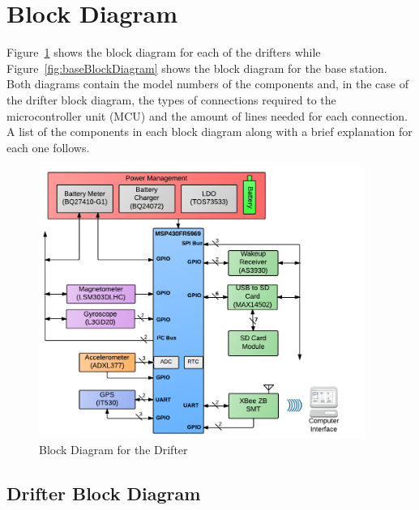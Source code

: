 \section{Block Diagram}

Figure~\ref{fig:drifterBlockDiagram} shows the block diagram for each of the drifters while Figure~\ref{fig:baseBlockDiagram} shows the block diagram for the base station.  Both diagrams contain the model numbers of the components and, in the case of the drifter block diagram, the types of connections required to the microcontroller unit (MCU) and the amount of lines needed for each connection.  A list of the components in each block diagram along with a brief explanation for each one follows.

\begin{figure}[ht]
	\centering
	\includegraphics[width=0.95\textwidth]{img/blockDiagram}
	\caption{Block Diagram for the Drifter \label{fig:drifterBlockDiagram}}
\end{figure}

\subsection{Drifter Block Diagram}


